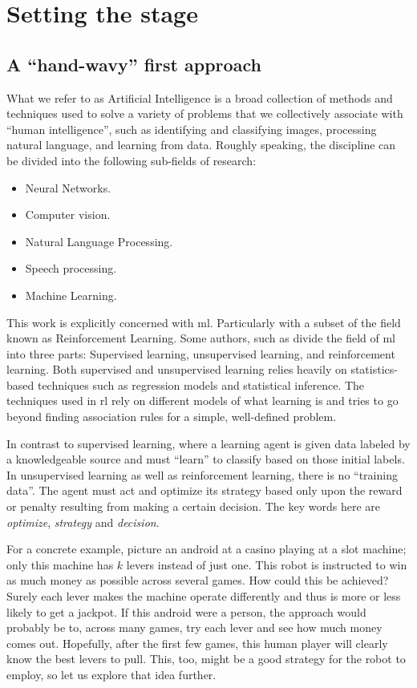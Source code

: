 \chapter{Setting the stage}
\label{chapter:Motivation}
\section{A ``hand-wavy'' first approach}

What we refer to as Artificial Intelligence is a broad collection of methods and
techniques used to solve a variety of problems that we collectively associate
with ``human intelligence'', such as identifying and classifying images, 
processing natural language, and learning from data. Roughly speaking, the
discipline can be divided into the following sub-fields of research:

\begin{itemize}
	\item Neural Networks.
	\item Computer vision.
	\item Natural Language Processing.
	\item Speech processing.
	\item Machine Learning.
\end{itemize}

This work is explicitly concerned with \ac{ml}. Particularly with a
subset of the field known as Reinforcement Learning. Some authors, such as
\cite[Ch.~1]{SuttonBarto} divide the field of \ac{ml} into three parts:
Supervised learning, unsupervised learning, and reinforcement learning. Both
supervised and unsupervised learning relies heavily on statistics-based
techniques such as regression models and statistical inference.  The techniques
used in \ac{rl} rely on different models of what learning is and tries to go
beyond finding association rules for a simple, well-defined problem.

In contrast to supervised learning, where a learning agent is given data labeled
by a knowledgeable source and must ``learn'' to classify based on those initial
labels. In unsupervised learning as well as reinforcement learning, there is no
``training data''. The agent must act and optimize its strategy based only upon
the reward or penalty resulting from making a certain decision. The key words
here are \textit{optimize},  \textit{strategy} and \textit{decision}.

For a concrete example, picture an android at a casino playing at a slot
machine; only this machine has $k$ levers instead of just one. This robot is
instructed to win as much money as possible across several games. How could this
be achieved? Surely each lever makes the machine operate differently and thus is
more or less likely to get a jackpot.  If this android were a person, the
approach would probably be to, across many games, try each lever and see how
much money comes out. Hopefully, after the first few games, this human player
will clearly know the best levers to pull.  This, too, might be a good strategy
for the robot to employ, so let us explore that idea further.

